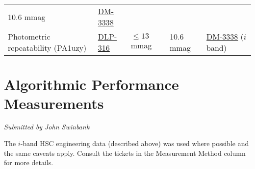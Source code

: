 \documentclass[DM,toc]{lsstdoc}
\begin{document}
\begin{longtable}[]{@{}lllll@{}}
\begin{minipage}[t]{0.11\columnwidth}
10.6 mmag\strut
\end{minipage} & \begin{minipage}[t]{0.19\columnwidth}\raggedright\strut
\href{https://jira.lsstcorp.org/browse/DM-3338}{DM-3338}\strut
\end{minipage}\tabularnewline
\begin{minipage}[t]{0.25\columnwidth}\raggedright\strut
Photometric repeatability (PA1uzy)\strut
\end{minipage} & \begin{minipage}[t]{0.11\columnwidth}\raggedright\strut
\href{https://jira.lsstcorp.org/browser/DLP-316}{DLP-316}\strut
\end{minipage} & \begin{minipage}[t]{0.20\columnwidth}\raggedright\strut
\(\leq 13\) mmag\strut
\end{minipage} & \begin{minipage}[t]{0.11\columnwidth}\raggedright\strut
10.6 mmag\strut
\end{minipage} & \begin{minipage}[t]{0.19\columnwidth}\raggedright\strut
\href{https://jira.lsstcorp.org/browse/DM-3338}{DM-3338} ($i$ band)\strut
\end{minipage}\tabularnewline
\bottomrule
\end{longtable}

\section{Algorithmic Performance
Measurements}\label{algorithmic-performance-measurements}

\emph{Submitted by John Swinbank}

The $i$-band HSC engineering data (described above) was used where
possible and the same caveats apply. Consult the tickets in the
Measurement Method column for more details.
\end{document}
